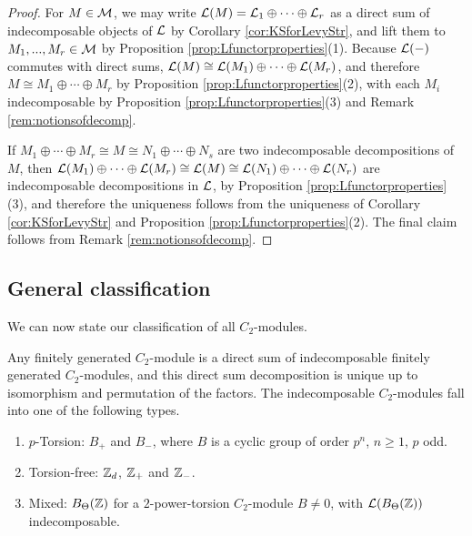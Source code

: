 \begin{proof}
  For $M \in {\mathcal M}$, we may write ${\mathcal L}(M) = {\mathcal L}_1 \oplus \cdots \oplus {\mathcal L}_r$ as a direct sum of indecomposable objects of ${\mathcal L}$ by Corollary \ref{cor:KSforLevyStr}, and lift them to $M_1, ... , M_r \in {\mathcal M}$ by Proposition \ref{prop:Lfunctorproperties}(1). Because ${\mathcal L}(-)$ commutes with direct sums, ${\mathcal L}(M) \cong {\mathcal L}(M_1) \oplus \cdots \oplus {\mathcal L}(M_r)$, and therefore $M \cong M_1 \oplus \cdots \oplus M_r$ by Proposition \ref{prop:Lfunctorproperties}(2), with each $M_i$ indecomposable by Proposition \ref{prop:Lfunctorproperties}(3) and Remark \ref{rem:notionsofdecomp}. 

  If $M_1 \oplus \cdots \oplus M_r \cong M \cong N_1 \oplus \cdots \oplus N_s$ are two indecomposable decompositions of $M$, then ${\mathcal L}(M_1) \oplus \cdots \oplus {\mathcal L}(M_r) \cong {\mathcal L}(M) \cong {\mathcal L}(N_1) \oplus \cdots \oplus {\mathcal L}(N_r)$ are indecomposable decompositions in ${\mathcal L}$, by Proposition \ref{prop:Lfunctorproperties}(3), and therefore the uniqueness follows from the uniqueness of Corollary \ref{cor:KSforLevyStr} and Proposition \ref{prop:Lfunctorproperties}(2). The final claim follows from Remark \ref{rem:notionsofdecomp}.
\end{proof}


\subsection{General classification} We can now state our classification of all $C_2$-modules.

\begin{thm}\label{thm:generalclassification} 
  Any finitely generated $C_2$-module is a direct sum of indecomposable finitely generated $C_2$-modules, and this direct sum decomposition is unique up to isomorphism and permutation of the factors. The indecomposable $C_2$-modules fall into one of the following types.
\begin{enumerate}
\item $p$-Torsion: $B_+$ and $B_-$, where $B$ is a cyclic group of order $p^n$, $n \geq 1$, $p$ odd.
\item Torsion-free: ${\mathbb Z}_d$, ${\mathbb Z}_+$ and ${\mathbb Z}_-$.
\item Mixed: $B_\Theta({\mathbb Z})$ for a $2$-power-torsion $C_2$-module $B \neq 0$, with ${\mathcal L}(B_\Theta({\mathbb Z}))$ indecomposable.
\end{enumerate}
\end{thm}

